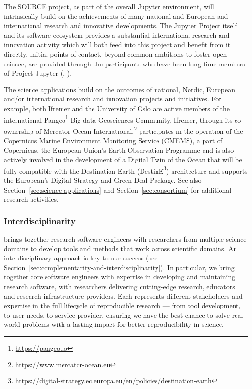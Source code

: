 The SOURCE project, as part of the overall Jupyter environment, will intrinsically build on the achievements of many
national and European and international research and innovative developments.
The Jupyter Project itself and its software ecosystem provides a substantial international
 research and innovation activity which will both feed into this project and benefit from it directly.
 Initial points of contact, beyond common ambitions to foster open science, are
 provided through the participants who have been long-time members of Project
 Jupyter (, ).

The science applications build on the outcomes of national, Nordic, European and/or international research and
innovation projects and initiatives. For example, both Ifremer and the University of Oslo are active members of the international
Pangeo\footnote{\url{https://pangeo.io}} Big data Geosciences Community. Ifremer, through its co-ownership of Mercator Ocean International,\footnote{\url{https://www.mercator-ocean.eu}}
 participates in the operation of the Copernicus Marine Environment Monitoring Service (CMEMS),
 a part of Copernicus, the European Union’s Earth Observation Programme and is also actively involved in the
 development of a Digital Twin of the Ocean that will be fully compatible with the Destination Earth (DestinE\footnote{\url{https://digital-strategy.ec.europa.eu/en/policies/destination-earth}})
 architecture and supports the European's Digital Strategy and Green Deal
 Package.
 See also Section~\ref{sec:science-applications} and
 Section~\ref{sec:consortium} for additional research activities.

\subsubsection{Interdisciplinarity}

\TheProject{} brings together research software engineers with researchers from
multiple science domains to develop tools and methods that work across
scientific domains. An interdisciplinary approach is key to our success
(see Section~\ref{sec:complementarity-and-interdisciplinarity}).
In particular, we bring together core software engineers with expertise in developing and maintaining research software,
with researchers delivering cutting-edge research,
educators, and research infrastructure providers.
Each represents different stakeholders and expertise in the full lifecycle of reproducible research --- from tool development, to user needs, to service provider,
ensuring we have the best chance to solve real-world problems
with a lasting impact for better reproducibility in science.

